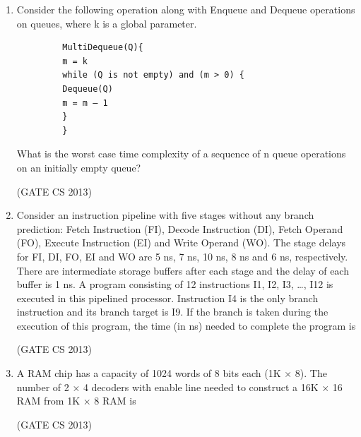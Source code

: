 \documentclass[a4paper, 11pt]{article}
\begin{document}
\begin{enumerate}
     \item Consider the following operation along with Enqueue and Dequeue operations on queues, where k is a global parameter.
     \begin{lstlisting}
         MultiDequeue(Q){
         m = k
         while (Q is not empty) and (m > 0) {
         Dequeue(Q)
         m = m – 1
         }
         }
     \end{lstlisting}
     What is the worst case time complexity of a sequence of n queue operations on an initially empty queue?
     \begin{enumerate}
     \end{enumerate}
     \hfill (GATE CS 2013)

     \item Consider an instruction pipeline with five stages without any branch prediction: Fetch Instruction (FI), Decode Instruction (DI), Fetch Operand (FO), Execute Instruction (EI) and Write Operand (WO). The stage delays for FI, DI, FO, EI and WO are 5 ns, 7 ns, 10 ns, 8 ns and 6 ns, respectively. There are intermediate storage buffers after each stage and the delay of each buffer is 1 ns. A program consisting of 12 instructions I1, I2, I3, …, I12 is executed in this pipelined processor. Instruction I4 is the only branch instruction and its branch target is I9. If the branch is taken during the execution of this program, the time (in ns) needed to complete the program is
     \begin{enumerate}
     \end{enumerate}
     \hfill (GATE CS 2013)
     \item A RAM chip has a capacity of 1024 words of 8 bits each (1K × 8). The number of 2 × 4 decoders with enable line needed to construct a 16K × 16 RAM from 1K × 8 RAM is 
     \begin{enumerate}
     \end{enumerate}
     \hfill (GATE CS 2013)


\end{enumerate}
\end{document}
